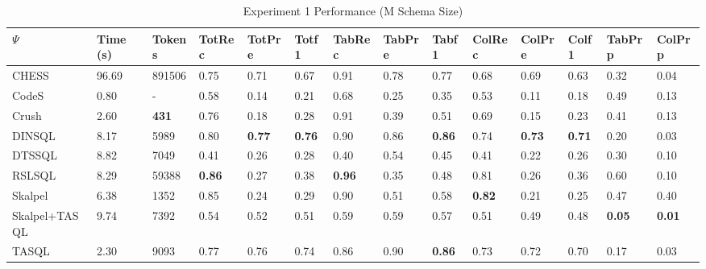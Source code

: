 \begin{table}
\caption{Experiment 1 Performance (M Schema Size)}
\label{tab:exp1-m-schema}
\begin{tabular}{llllllllllllll}
\toprule
$\Psi$ & Time (s) & Tokens & TotRec & TotPre & Totf1 & TabRec & TabPre & Tabf1 & ColRec & ColPre & Colf1 & TabPrp & ColPrp \\
\midrule
CHESS & 96.69 & 891506 & 0.75 & 0.71 & 0.67 & 0.91 & 0.78 & 0.77 & 0.68 & 0.69 & 0.63 & 0.32 & 0.04 \\
CodeS & 0.80 & - & 0.58 & 0.14 & 0.21 & 0.68 & 0.25 & 0.35 & 0.53 & 0.11 & 0.18 & 0.49 & 0.13 \\
Crush & 2.60 & \textbf{431} & 0.76 & 0.18 & 0.28 & 0.91 & 0.39 & 0.51 & 0.69 & 0.15 & 0.23 & 0.41 & 0.13 \\
DINSQL & 8.17 & 5989 & 0.80 & \textbf{0.77} & \textbf{0.76} & 0.90 & 0.86 & \textbf{0.86} & 0.74 & \textbf{0.73} & \textbf{0.71} & 0.20 & 0.03 \\
DTSSQL & 8.82 & 7049 & 0.41 & 0.26 & 0.28 & 0.40 & 0.54 & 0.45 & 0.41 & 0.22 & 0.26 & 0.30 & 0.10 \\
RSLSQL & 8.29 & 59388 & \textbf{0.86} & 0.27 & 0.38 & \textbf{0.96} & 0.35 & 0.48 & 0.81 & 0.26 & 0.36 & 0.60 & 0.10 \\
Skalpel & 6.38 & 1352 & 0.85 & 0.24 & 0.29 & 0.90 & 0.51 & 0.58 & \textbf{0.82} & 0.21 & 0.25 & 0.47 & 0.40 \\
Skalpel+TASQL & 9.74 & 7392 & 0.54 & 0.52 & 0.51 & 0.59 & 0.59 & 0.57 & 0.51 & 0.49 & 0.48 & \textbf{0.05} & \textbf{0.01} \\
TASQL & 2.30 & 9093 & 0.77 & 0.76 & 0.74 & 0.86 & 0.90 & \textbf{0.86} & 0.73 & 0.72 & 0.70 & 0.17 & 0.03 \\
\bottomrule
\end{tabular}
\end{table}
